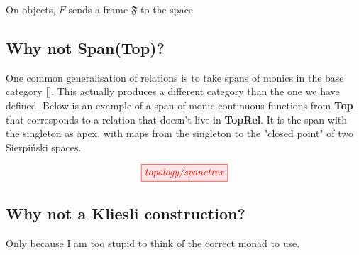 \begin{defn}
On objects, $F$ sends a frame $\mathfrak{F}$ to the space
\end{defn}

\subsection{Why not Span(\textbf{Top})?}

One common generalisation of relations is to take spans of monics in the base category []. This actually produces a different category than the one we have defined. Below is an example of a span of monic continuous functions from \textbf{Top} that corresponds to a relation that doesn't live in \textbf{TopRel}. It is the span with the singleton as apex, with maps from the singleton to the "closed point" of two Sierpi\'{n}ski spaces.

\[\tikzfig{topology/spanctrex}\]

\subsection{Why not a Kliesli construction?}

Only because I am too stupid to think of the correct monad to use.